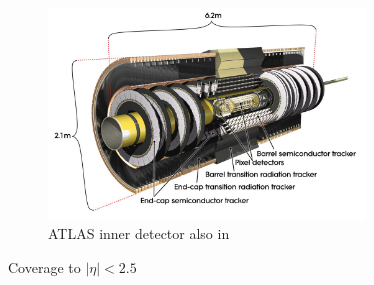 \begin{figure}[ht]
  \centering
  \includegraphics[width=0.75\textwidth]{./figures/atlas/inner_detector.jpg}
  \caption{ATLAS inner detector\cite{indet_fig} also in \cite{atlas_detector}}
  \label{fig:atlas_indet}
\end{figure}


Coverage to $|\eta| < 2.5$

